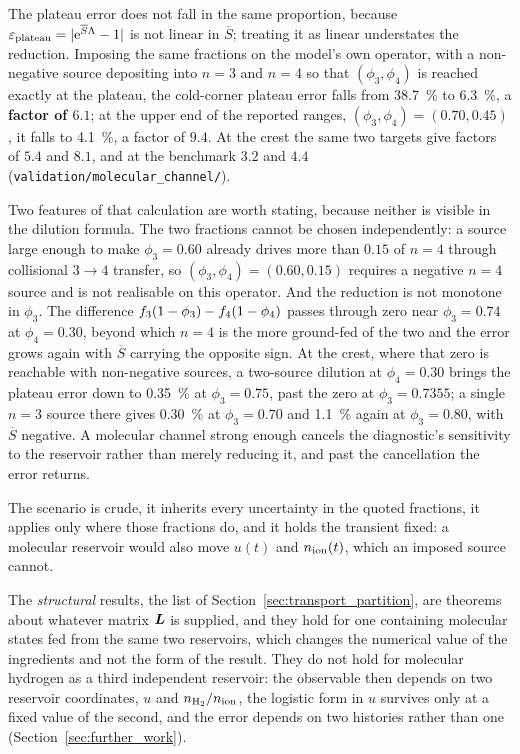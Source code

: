 The plateau error does not fall in the same proportion, because
$\varepsilon_{\mathrm{plateau}} = |\mathrm{e}^{\overline{S}\Lambda}-1|$ is not linear in
$\overline{S}$; treating it as linear understates the reduction. Imposing the
same fractions on the model's own operator, with a non-negative source
depositing into $n=3$ and $n=4$ so that $(\phi_3,\phi_4)$ is reached exactly at
the plateau, the cold-corner plateau error falls from \SI{38.7}{\percent} to
\SI{6.3}{\percent}, a \textbf{factor of $6.1$}; at the upper end of the
reported ranges, $(\phi_3,\phi_4) = (0.70,0.45)$, it falls to \SI{4.1}{\percent},
a factor of $9.4$. At the crest the same two targets give factors of $5.4$ and
$8.1$, and at the benchmark $3.2$ and $4.4$
(\texttt{validation/molecular\_channel/}).

Two features of that calculation are worth stating, because neither is visible
in the dilution formula. The two fractions cannot be chosen independently: a
source large enough to make $\phi_3 = 0.60$ already drives more than $0.15$ of
$n=4$ through collisional $3\to4$ transfer, so $(\phi_3,\phi_4) = (0.60,0.15)$
requires a negative $n=4$ source and is not realisable on this operator. And
the reduction is not monotone in $\phi_3$. The difference
$f_{3}(1-\phi_3) - f_{4}(1-\phi_4)$ passes through zero near
$\phi_3 = 0.74$ at $\phi_4 = 0.30$, beyond which $n=4$ is the more ground-fed
of the two and the error grows again with $\overline{S}$ carrying the opposite
sign. At the crest, where that zero is reachable with non-negative sources, a
two-source dilution at $\phi_4 = 0.30$ brings the plateau error down to
\SI{0.35}{\percent} at $\phi_3 = 0.75$, past the zero at $\phi_3 = 0.7355$; a
single $n=3$ source there gives \SI{0.30}{\percent} at $\phi_3 = 0.70$ and
\SI{1.1}{\percent} again at $\phi_3 = 0.80$, with $\overline{S}$ negative. A
molecular channel strong enough cancels the diagnostic's sensitivity to the
reservoir rather than merely reducing it, and past the cancellation the error
returns.

The scenario is crude, it inherits every uncertainty in the quoted fractions,
it applies only where those fractions do, and it holds the transient fixed: a
molecular reservoir would also move $u(t)$ and $n_{\mathrm{ion}}(t)$, which an imposed
source cannot.

The \emph{structural} results, the list of Section~\ref{sec:transport_partition},
are theorems about whatever matrix $\bm{L}$ is supplied, and they hold for one
containing molecular states fed from the same two reservoirs, which changes the
numerical value of the ingredients and not the form of the result. They do not
hold for molecular hydrogen as a third independent reservoir: the observable
then depends on two reservoir coordinates, $u$ and $n_{\mathrm{H}_2}/n_{\mathrm{ion}}$, the
logistic form in $u$ survives only at a fixed value of the second, and the error
depends on two histories rather than one (Section~\ref{sec:further_work}).

